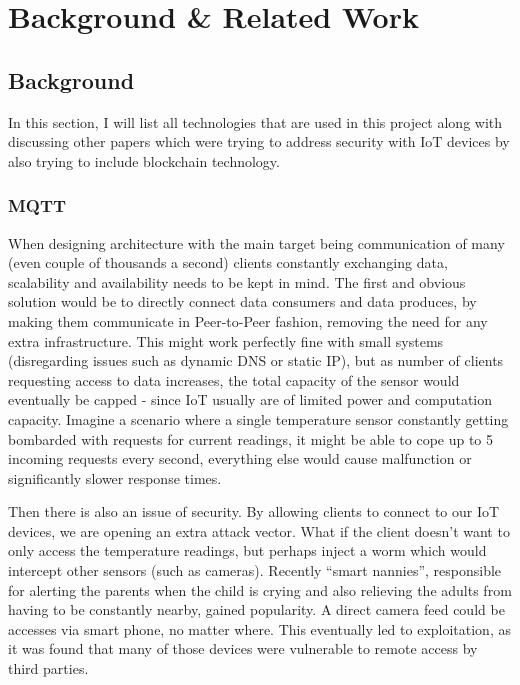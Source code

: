 \chapter{Background \& Related Work}
\section{Background}
In this section, I will list all technologies that are used in this project along with discussing other papers which were trying to address security with IoT devices by also trying to include blockchain technology.
\subsection{MQTT}
When designing architecture with the main target being communication of many (even couple of thousands a second) clients constantly exchanging data, scalability and availability needs to be kept in mind. The first and obvious solution would be to directly connect data consumers and data produces, by making them communicate in Peer-to-Peer fashion, removing the need for any extra infrastructure. This might work perfectly fine with small systems (disregarding issues such as dynamic DNS or static IP), but as number of clients requesting access to data increases, the total capacity of the sensor would eventually be capped - since IoT usually are of limited power and computation capacity. Imagine a scenario where a single temperature sensor constantly getting bombarded with requests for current readings, it might be able to cope up to 5 incoming requests every second, everything else would cause malfunction or significantly slower response times.

Then there is also an issue of security. By allowing clients to connect to our IoT devices, we are opening an extra attack vector. What if the client doesn't want to only access the temperature readings, but perhaps inject a worm which would intercept other sensors (such as cameras). Recently ``smart nannies'', responsible for alerting the parents when the child is crying and also relieving the adults from having to be constantly nearby, gained popularity. A direct camera feed could be accesses via smart phone, no matter where. This eventually led to exploitation, as it was found that many of those devices were vulnerable to remote access by third parties\cite{pultarova2016webcam}.

